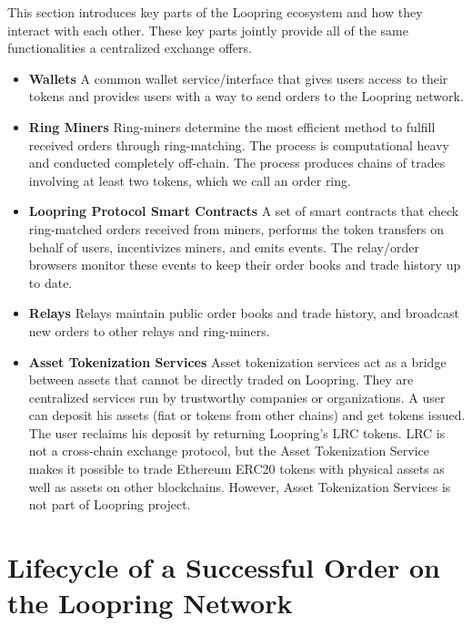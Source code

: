 \documentclass[UTF8,nofonts]{article}
\begin{document}
This section introduces key parts of the Loopring ecosystem and how they interact with each other. These key parts jointly provide all of the same functionalities a centralized exchange offers.
\begin{itemize}


\item \textbf{Wallets}
A common wallet service/interface that gives users access to their tokens and provides users with a way to send orders to the Loopring network.

\item \textbf{Ring Miners}
Ring-miners determine the most efficient method to fulfill received orders through ring-matching. The process is computational heavy and conducted completely off-chain. The process produces chains of trades involving at least two tokens, which we call an order ring.

\item \textbf{Loopring Protocol Smart Contracts}
A set of smart contracts that check ring-matched orders received from miners, performs the token transfers on behalf of users, incentivizes miners, and emits events. The relay/order browsers monitor these events to keep their order books and trade history up to date.

\item \textbf{Relays}
Relays maintain public order books and trade history, and broadcast new orders to other relays and ring-miners.

\item \textbf{Asset Tokenization Services}
Asset tokenization services act as a bridge between assets that cannot be directly traded on Loopring. They are centralized services run by trustworthy companies or organizations. A user can deposit his assets (fiat or tokens from other chains) and get tokens issued. The user reclaims his deposit by returning Loopring’s LRC tokens. LRC is not a cross-chain exchange protocol, but the Asset Tokenization Service makes it possible to trade Ethereum ERC20 tokens with physical assets as well as assets on other blockchains. However, Asset Tokenization Services is not part of Loopring project.
\end{itemize}

\section{Lifecycle of a Successful Order on the Loopring Network}
\end{document}
